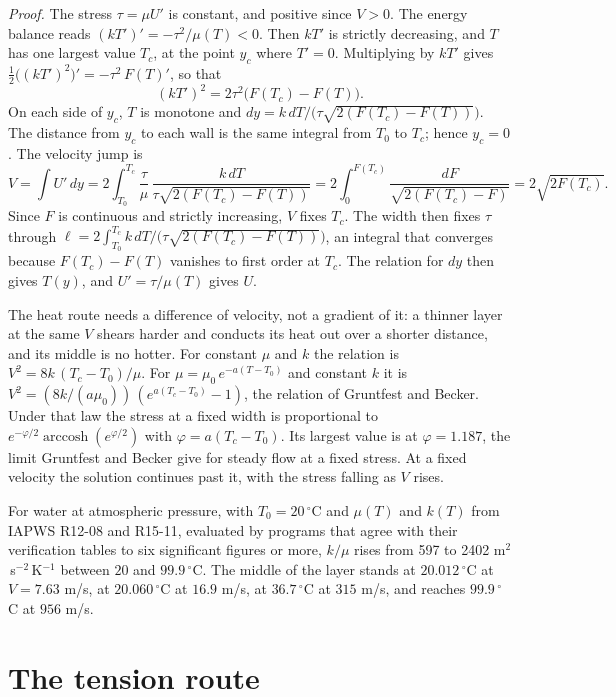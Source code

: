 \emph{Proof.} The stress $\tau = \mu U'$ is constant, and positive since $V > 0$. The energy
balance reads $(kT')' = -\tau^2/\mu(T) < 0$. Then $kT'$ is strictly decreasing, and $T$ has one
largest value $T_c$, at the point $y_c$ where $T' = 0$. Multiplying by $kT'$ gives
$\tfrac12\big((kT')^2\big)' = -\tau^2\,F(T)'$, so that
\[
(kT')^2 = 2\tau^2\big(F(T_c) - F(T)\big).
\]
On each side of $y_c$, $T$ is monotone and $dy = k\,dT/\big(\tau\sqrt{2(F(T_c) - F(T))}\big)$. The
distance from $y_c$ to each wall is the same integral from $T_0$ to $T_c$; hence $y_c = 0$. The
velocity jump is
\[
V = \int U'\,dy = 2\int_{T_0}^{T_c}\frac{\tau}{\mu}\,
\frac{k\,dT}{\tau\sqrt{2(F(T_c) - F(T))}} = 2\int_0^{F(T_c)}\frac{dF}{\sqrt{2(F(T_c) - F)}}
= 2\sqrt{2F(T_c)} .
\]
Since $F$ is continuous and strictly increasing, $V$ fixes $T_c$. The width then fixes $\tau$
through $\ell = 2\int_{T_0}^{T_c} k\,dT/\big(\tau\sqrt{2(F(T_c)-F(T))}\big)$, an integral that
converges because $F(T_c) - F(T)$ vanishes to first order at $T_c$. The relation for $dy$ then
gives $T(y)$, and $U' = \tau/\mu(T)$ gives $U$. \hfill\qedsymbol

The heat route needs a difference of velocity, not a gradient of it: a thinner layer at the same
$V$ shears harder and conducts its heat out over a shorter distance, and its middle is no hotter.
For constant $\mu$ and $k$ the relation is $V^2 = 8k\,(T_c - T_0)/\mu$. For
$\mu = \mu_0\,e^{-a(T-T_0)}$ and constant $k$ it is
$V^2 = (8k/(a\mu_0))\,(e^{a(T_c - T_0)} - 1)$, the relation of Gruntfest and Becker. Under that law
the stress at a fixed width is proportional to $e^{-\varphi/2}\operatorname{arccosh}(e^{\varphi/2})$
with $\varphi = a(T_c - T_0)$. Its largest value is at $\varphi = 1.187$, the limit Gruntfest and
Becker give for steady flow at a fixed stress. At a fixed velocity the solution continues past it,
with the stress falling as $V$ rises.

For water at atmospheric pressure, with $T_0 = 20\,^\circ$C and $\mu(T)$ and $k(T)$ from IAPWS
R12-08 and R15-11, evaluated by programs that agree with their verification tables to six
significant figures or more, $k/\mu$ rises
from 597 to 2402 m$^2$\,s$^{-2}$\,K$^{-1}$ between $20$ and $99.9\,^\circ$C. The middle of the layer
stands at $20.012\,^\circ$C at $V = 7.63$ m/s, at $20.060\,^\circ$C at $16.9$ m/s, at
$36.7\,^\circ$C at $315$ m/s, and reaches $99.9\,^\circ$C at $956$ m/s.

\section{The tension route}

